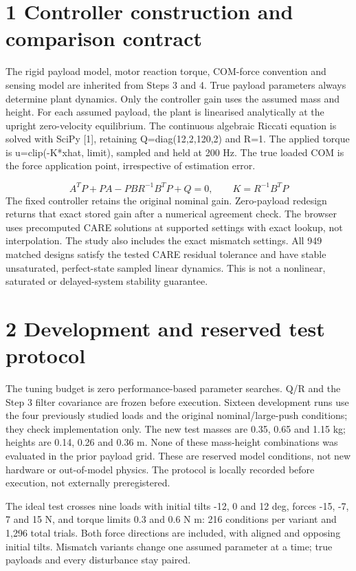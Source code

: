 \documentclass[11pt,a4paper]{article}
\begin{document}
\clearpage
\section*{1 Controller construction and comparison contract}
The rigid payload model, motor reaction torque, COM-force convention and sensing model are inherited from Steps 3 and 4. True payload parameters always determine plant dynamics. Only the controller gain uses the assumed mass and height. For each assumed payload, the plant is linearised analytically at the upright zero-velocity equilibrium. The continuous algebraic Riccati equation is solved with SciPy [1], retaining Q=diag(12,2,120,2) and R=1. The applied torque is u=clip(-K*xhat, limit), sampled and held at 200 Hz. The true loaded COM is the force application point, irrespective of estimation error.

\begin{equation}A^T P+PA-PBR^{-1}B^TP+Q=0,\qquad K=R^{-1}B^TP\end{equation}
The fixed controller retains the original nominal gain. Zero-payload redesign returns that exact stored gain after a numerical agreement check. The browser uses precomputed CARE solutions at supported settings with exact lookup, not interpolation. The study also includes the exact mismatch settings. All 949 matched designs satisfy the tested CARE residual tolerance and have stable unsaturated, perfect-state sampled linear dynamics. This is not a nonlinear, saturated or delayed-system stability guarantee.

\section*{2 Development and reserved test protocol}
The tuning budget is zero performance-based parameter searches. Q/R and the Step 3 filter covariance are frozen before execution. Sixteen development runs use the four previously studied loads and the original nominal/large-push conditions; they check implementation only. The new test masses are 0.35, 0.65 and 1.15 kg; heights are 0.14, 0.26 and 0.36 m. None of these mass-height combinations was evaluated in the prior payload grid. These are reserved model conditions, not new hardware or out-of-model physics. The protocol is locally recorded before execution, not externally preregistered.

The ideal test crosses nine loads with initial tilts -12, 0 and 12 deg, forces -15, -7, 7 and 15 N, and torque limits 0.3 and 0.6 N m: 216 conditions per variant and 1,296 total trials. Both force directions are included, with aligned and opposing initial tilts. Mismatch variants change one assumed parameter at a time; true payloads and every disturbance stay paired.
\end{document}
